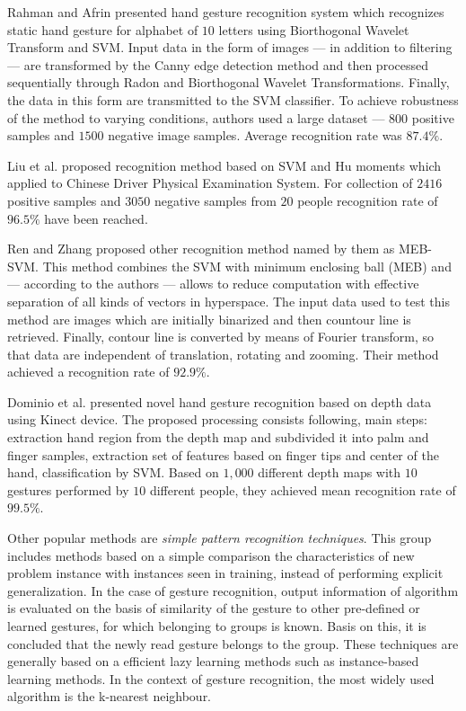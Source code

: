 Rahman and Afrin \cite{RahmanHand} presented hand gesture recognition system which recognizes static hand gesture for alphabet of $10$ letters using Biorthogonal Wavelet Transform and SVM. Input data in the form of images --- in addition to filtering --- are transformed by the Canny edge detection method and then processed sequentially through Radon and Biorthogonal Wavelet Transformations. Finally, the data in this form are transmitted to the SVM classifier. To achieve robustness of the method to varying conditions, authors used a large dataset --- $800$ positive samples and $1500$ negative image samples. Average recognition rate was $87.4\%$.

Liu et al. \cite{LiuStatic} proposed recognition method based on SVM and Hu moments which applied to Chinese Driver Physical Examination System. For collection of $2416$ positive samples and $3050$ negative samples from $20$ people recognition rate of $96.5\%$ have been reached.

Ren and Zhang \cite{RenMEBSVM} proposed other recognition method named by them as MEB-SVM. This method combines the SVM with minimum enclosing ball (MEB) and --- according to the authors --- allows to reduce computation with effective separation of all kinds of vectors in hyperspace. The input data used to test this method are images which are initially binarized and then countour line is retrieved. Finally, contour line is converted by means of Fourier transform, so that data are independent of translation, rotating and zooming. Their method achieved a recognition rate of $92.9\%$.


Dominio et al. \cite{Dominio:2013:HGR:2510650.2510651} presented novel hand gesture recognition based on depth data using Kinect device. The proposed processing consists following, main steps: extraction hand region from the depth map and subdivided it into palm and finger samples, extraction set of features based on finger tips and center of the hand, classification by SVM. Based on $1,000$ different depth maps with $10$ gestures performed by $10$ different people, they achieved mean recognition rate of $99.5\%$.

Other popular methods are \emph{simple pattern recognition techniques}. This group includes methods based on a simple comparison the characteristics of new problem instance with instances seen in training, instead of performing explicit generalization. In the case of gesture recognition, output information of algorithm is evaluated on the basis of similarity of the gesture to other pre-defined or learned gestures, for which belonging to groups is known. Basis on this, it is concluded that the newly read gesture belongs to the group. These techniques are generally based on a efficient lazy learning methods such as instance-based learning methods.  In the context of gesture recognition, the most widely used algorithm is the k-nearest neighbour.

